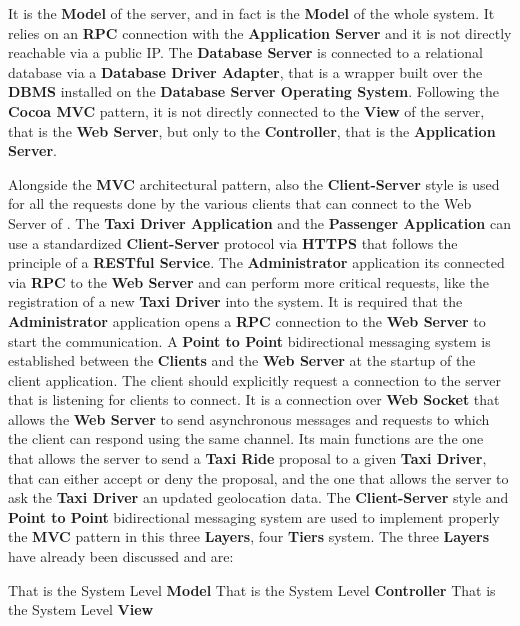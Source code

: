 \begin{itemize}
\begin{itemize}
		 It is the \textbf{Model} of the server, and in fact is the \textbf{Model} of the whole \myTaxiService{} system. It relies on an \textbf{RPC} connection with the \textbf{Application Server} and it is not directly reachable via a public IP. The \textbf{Database Server} is connected to a relational database via a \textbf{Database Driver Adapter}, that is a wrapper built over the \textbf{DBMS} installed on the \textbf{Database Server Operating System}. Following the \textbf{Cocoa MVC} pattern, it is not directly connected to the \textbf{View} of the server, that is the \textbf{Web Server}, but only to the \textbf{Controller}, that is the \textbf{Application Server}.
	\end{itemize}
\end{itemize}
Alongside the \textbf{MVC} architectural pattern, also the \textbf{Client-Server} style is used for all the requests done by the various clients that can connect to the Web Server of \myTaxiService{}. The \textbf{Taxi Driver Application} and the \textbf{Passenger Application} can use a standardized \textbf{Client-Server} protocol via \textbf{HTTPS} that follows the principle of a \textbf{RESTful Service}. The \textbf{Administrator} application its connected via \textbf{RPC} to the \textbf{Web Server} and can perform more critical requests, like the registration of a new \textbf{Taxi Driver} into the system. It is required that the \textbf{Administrator} application opens a \textbf{RPC} connection to the \textbf{Web Server} to start the communication.
A \textbf{Point to Point} bidirectional messaging system is established between the \textbf{Clients} and the \textbf{Web Server} at the startup of the client application. The client should explicitly request a connection to the server that is listening for clients to connect. It is a connection over \textbf{Web Socket} that allows the \textbf{Web Server} to send asynchronous messages and requests to which the client can respond using the same channel. Its main functions are the one that allows the server to send a \textbf{Taxi Ride} proposal to a given \textbf{Taxi Driver}, that can either accept or deny the proposal, and the one that allows the server to ask the \textbf{Taxi Driver} an updated geolocation data.
The \textbf{Client-Server} style and \textbf{Point to Point} bidirectional messaging system are used to implement properly the \textbf{MVC} pattern in this three \textbf{Layers}, four \textbf{Tiers} system.
The three \textbf{Layers} have already been discussed and are:
\begin{itemize}
	 That is the System Level \textbf{Model}
	 That is the System Level \textbf{Controller}
	 That is the System Level \textbf{View}
\end{itemize}

